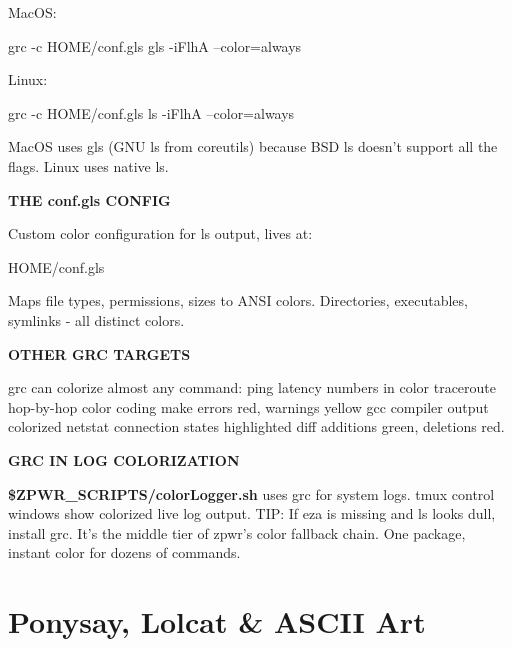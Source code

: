 \documentclass[11pt,a4paper,twoside]{book}
\begin{document}
MacOS:

\begin{codebox}
\color{neongreen}grc -c HOME/conf.gls gls -iFlhA --color=always\\
\end{codebox}

Linux:

\begin{codebox}
\color{neongreen}grc -c HOME/conf.gls ls -iFlhA --color=always\\
\end{codebox}

MacOS uses gls (GNU ls from coreutils) because BSD ls doesn't support all the flags. Linux uses native ls.


\vspace{12pt}
{\bfseries\color{neonyellow} THE conf.gls CONFIG}\vspace{4pt}

Custom color configuration for ls output, lives at:

\begin{codebox}
\color{neongreen}HOME/conf.gls\\
\end{codebox}

Maps file types, permissions, sizes to ANSI colors. Directories, executables, symlinks - all distinct colors.


\vspace{12pt}
{\bfseries\color{neonyellow} OTHER GRC TARGETS}\vspace{4pt}

grc can colorize almost any command: ping         latency numbers in color traceroute   hop-by-hop color coding make         errors red, warnings yellow gcc          compiler output colorized netstat      connection states highlighted diff         additions green, deletions red.


\vspace{12pt}
{\bfseries\color{neonyellow} GRC IN LOG COLORIZATION}\vspace{4pt}

\textbf{\$ZPWR\_SCRIPTS/colorLogger.sh} uses grc for system logs. tmux control windows show colorized live log output. TIP: If eza is missing and ls looks dull, install grc. It's the middle tier of zpwr's color fallback chain. One package, instant color for dozens of commands.


\vspace{16pt}

\section{Ponysay, Lolcat \& ASCII Art}
\end{document}
